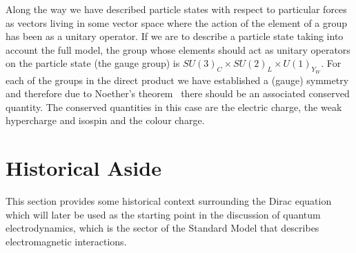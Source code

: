 Along the way we have described particle states with respect to particular
forces as vectors living in some vector space where the action of the element of
a group has been as a unitary operator. If we are to describe a particle state
taking into account the full model, the group whose elements should act as
unitary operators on the particle state (the gauge group) is $SU{(3)}_{C} \times
SU{(2)}_{L} \times U{(1)}_{Y_{W}}$. For each of the groups in the direct product
we have established a (gauge) symmetry and therefore due to Noether's
theorem~\cite{Noether_1971} there should be an associated conserved quantity.
The conserved quantities in this case are the electric charge, the weak
hypercharge and isospin and the colour charge.


\section{Historical Aside}%
\label{sec:history}

This section provides some historical context surrounding the Dirac equation
which will later be used as the starting point in the discussion of quantum
electrodynamics, which is the sector of the Standard Model that describes
electromagnetic interactions.

